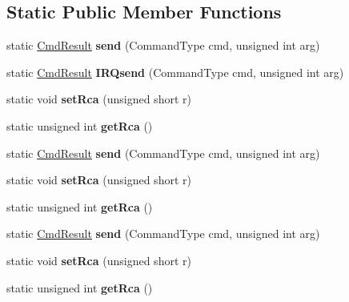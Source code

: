 \subsection*{Static Public Member Functions}
\begin{DoxyCompactItemize}
\item 
\hypertarget{classmiosix_1_1_command_ac86a6d537fec52e625e030d1c753ae33}{static \hyperlink{classmiosix_1_1_cmd_result}{Cmd\-Result} {\bfseries send} (Command\-Type cmd, unsigned int arg)}\label{classmiosix_1_1_command_ac86a6d537fec52e625e030d1c753ae33}

\item 
\hypertarget{classmiosix_1_1_command_a82655af9be57770493440448738b9f3f}{static \hyperlink{classmiosix_1_1_cmd_result}{Cmd\-Result} {\bfseries I\-R\-Qsend} (Command\-Type cmd, unsigned int arg)}\label{classmiosix_1_1_command_a82655af9be57770493440448738b9f3f}

\item 
\hypertarget{classmiosix_1_1_command_aec71139d95483d043542f415897c9b5b}{static void {\bfseries set\-Rca} (unsigned short r)}\label{classmiosix_1_1_command_aec71139d95483d043542f415897c9b5b}

\item 
\hypertarget{classmiosix_1_1_command_ab32045036b1fbd67df1f9e29f7e756fd}{static unsigned int {\bfseries get\-Rca} ()}\label{classmiosix_1_1_command_ab32045036b1fbd67df1f9e29f7e756fd}

\item 
\hypertarget{classmiosix_1_1_command_aac877adcf901905b1a28b4baa23cdccc}{static \hyperlink{classmiosix_1_1_cmd_result}{Cmd\-Result} {\bfseries send} (Command\-Type cmd, unsigned int arg)}\label{classmiosix_1_1_command_aac877adcf901905b1a28b4baa23cdccc}

\item 
\hypertarget{classmiosix_1_1_command_aec71139d95483d043542f415897c9b5b}{static void {\bfseries set\-Rca} (unsigned short r)}\label{classmiosix_1_1_command_aec71139d95483d043542f415897c9b5b}

\item 
\hypertarget{classmiosix_1_1_command_ab32045036b1fbd67df1f9e29f7e756fd}{static unsigned int {\bfseries get\-Rca} ()}\label{classmiosix_1_1_command_ab32045036b1fbd67df1f9e29f7e756fd}

\item 
\hypertarget{classmiosix_1_1_command_aac877adcf901905b1a28b4baa23cdccc}{static \hyperlink{classmiosix_1_1_cmd_result}{Cmd\-Result} {\bfseries send} (Command\-Type cmd, unsigned int arg)}\label{classmiosix_1_1_command_aac877adcf901905b1a28b4baa23cdccc}

\item 
\hypertarget{classmiosix_1_1_command_aec71139d95483d043542f415897c9b5b}{static void {\bfseries set\-Rca} (unsigned short r)}\label{classmiosix_1_1_command_aec71139d95483d043542f415897c9b5b}

\item 
\hypertarget{classmiosix_1_1_command_ab32045036b1fbd67df1f9e29f7e756fd}{static unsigned int {\bfseries get\-Rca} ()}\label{classmiosix_1_1_command_ab32045036b1fbd67df1f9e29f7e756fd}

\end{DoxyCompactItemize}


